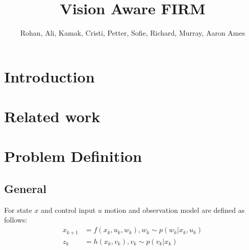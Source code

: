 \documentclass[conference]{IEEEtran}
\begin{document}

\title{\huge Vision Aware FIRM}

\author{Rohan, Ali, Kamak, Cristi, Petter, Sofie, Richard, Murray, Aaron Ames}

\maketitle

\begin{abstract}
\end{abstract}



\section{Introduction}

\section{Related work}
\cite{achtelik2014motion}

\cite{costante2018exploiting}

\cite{perception-aware-planning} 

\cite{Perception-Aware-Multiobjective-Search}

\cite{MapQualityEvaluation}

\section{Problem Definition}
\subsection{General}
For state $x$ and control input $u$ motion and observation model are defined as follows:
\begin{align}
x_{k+1} &= f(x_k, u_k, w_k), w_k \sim p(w_k|x_k,u_k) \\
z_k &= h(x_k, v_k), v_k \sim p(v_k|x_k)
\end{align}
\end{document}
